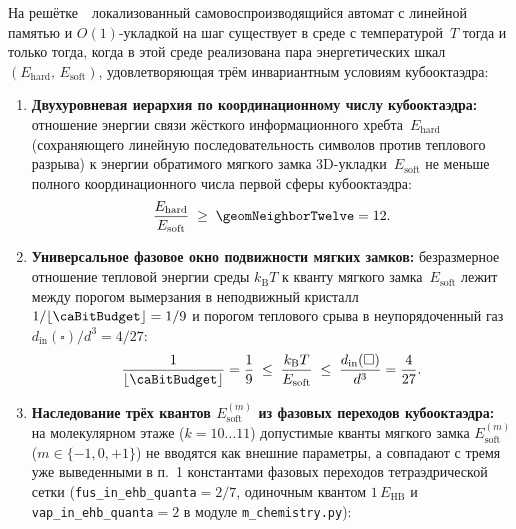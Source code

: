 \begin{theorem}
\label{thm:chem-three-thermal-windows}
На решётке~\latGCKshort\ локализованный самовоспроизводящийся автомат с линейной памятью и $O(1)$-укладкой на шаг существует в среде с температурой~$T$ тогда и только тогда, когда в этой среде реализована пара энергетических шкал $(E_{\mathrm{hard}},\,E_{\mathrm{soft}})$, удовлетворяющая трём инвариантным условиям кубооктаэдра:
\begin{enumerate}[leftmargin=*,noitemsep]
\item \textbf{Двухуровневая иерархия по координационному числу кубооктаэдра:}
  отношение энергии связи жёсткого информационного хребта~$E_{\mathrm{hard}}$ (сохраняющего линейную последовательность символов против теплового разрыва) к энергии обратимого мягкого замка $3\mathrm{D}$-укладки~$E_{\mathrm{soft}}$ не меньше полного координационного числа первой сферы кубооктаэдра:
  \begin{equation}
  \label{eq:chem-hard-soft-hierarchy-12}
    \frac{E_{\mathrm{hard}}}{E_{\mathrm{soft}}} \;\ge\; \geomNeighborTwelve = 12.
  \end{equation}
\item \textbf{Универсальное фазовое окно подвижности мягких замков:}
  безразмерное отношение тепловой энергии среды $k_{\mathrm{B}}T$ к кванту мягкого замка~$E_{\mathrm{soft}}$ лежит между порогом вымерзания в неподвижный кристалл $1/\lfloor\caBitBudget\rfloor = 1/9$ и порогом теплового срыва в неупорядоченный газ $d_{\mathrm{in}}(\square)/d^3 = 4/27$:
  \begin{equation}
  \label{eq:chem-universal-mobility-window}
    \frac{1}{\lfloor\caBitBudget\rfloor} = \frac{1}{9}
    \;\le\; \frac{k_{\mathrm{B}}T}{E_{\mathrm{soft}}}
    \;\le\; \frac{d_{\mathrm{in}}(\square)}{d^3} = \frac{4}{27}.
  \end{equation}
\item \textbf{Наследование трёх квантов $E_{\mathrm{soft}}^{(m)}$ из фазовых переходов кубооктаэдра:}
  на молекулярном этаже ($k=10\ldots 11$) допустимые кванты мягкого замка $E_{\mathrm{soft}}^{(m)}$ ($m\in\{-1,0,+1\}$) не вводятся как внешние параметры, а совпадают с тремя уже выведенными в п.~1 константами фазовых переходов тетраэдрической сетки (\texttt{fus\_in\_ehb\_quanta}${}=2/7$, одиночным квантом $1\,E_{\mathrm{HB}}$ и \texttt{vap\_in\_ehb\_quanta}${}=2$ в модуле \texttt{m\_chemistry.py}):
  \begin{equation}

\end{equation}
\end{enumerate}
\end{theorem}
